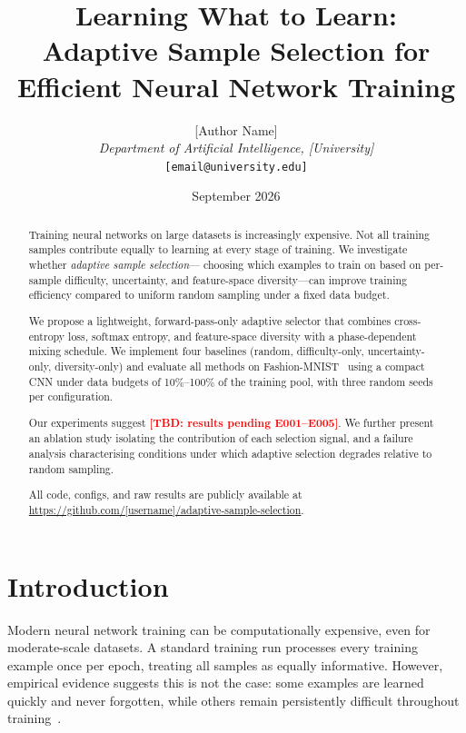 \documentclass[10pt,twocolumn]{article}
\title{%
  Learning What to Learn:\\
  Adaptive Sample Selection for Efficient Neural Network Training
}
\author{%
  [Author Name]\\
  \textit{Department of Artificial Intelligence, [University]}\\
  \texttt{[email@university.edu]}
}
\date{September 2026}
\newcommand{\tbd}[1]{\textcolor{red}{\textbf{[TBD: #1]}}}
\begin{document}

\maketitle

\begin{abstract}
Training neural networks on large datasets is increasingly expensive.
Not all training samples contribute equally to learning at every stage
of training. We investigate whether \emph{adaptive sample selection}---
choosing which examples to train on based on per-sample difficulty,
uncertainty, and feature-space diversity---can improve training efficiency
compared to uniform random sampling under a fixed data budget.

We propose a lightweight, forward-pass-only adaptive selector that
combines cross-entropy loss, softmax entropy, and feature-space diversity
with a phase-dependent mixing schedule.
We implement four baselines (random, difficulty-only, uncertainty-only,
diversity-only) and evaluate all methods on Fashion-MNIST~\citep{xiao2017fashionmnist}
using a compact CNN under data budgets of 10\%--100\% of the training pool,
with three random seeds per configuration.

Our experiments suggest \tbd{results pending E001--E005}. We further
present an ablation study isolating the contribution of each selection
signal, and a failure analysis characterising conditions under which
adaptive selection degrades relative to random sampling.

All code, configs, and raw results are publicly available at
\url{https://github.com/[username]/adaptive-sample-selection}.
\end{abstract}

\section{Introduction}
\label{sec:intro}

Modern neural network training can be computationally expensive, even for
moderate-scale datasets.
A standard training run processes every training example once per epoch,
treating all samples as equally informative.
However, empirical evidence suggests this is not the case: some examples
are learned quickly and never forgotten, while others remain persistently
difficult throughout training~\citep{toneva2019forgetting}.
\end{document}
